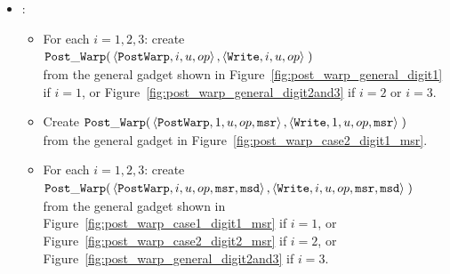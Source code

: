 \begin{itemize}
        \item {\postwarp}:
        \begin{itemize}
           \item For each $i = 1,2,3$: create\\
            $\begin{aligned}[t]
                \postwarp(& \left \langle {\tt PostWarp}, i, u, \inc \right\rangle,    %
                            \left \langle {\tt Write},    i, u, \inc \right\rangle \;) %
            \end{aligned}$ \\
            from the general gadget shown in Figure~\ref{fig:post_warp_general_digit1} if $i = 1$,
            or Figure~\ref{fig:post_warp_general_digit2and3} if $ i = 2$ or $i = 3$.
            \vspace{.5cm}


            \item Create
            $\begin{aligned}[t]
                \postwarp(& \left \langle {\tt PostWarp}, 1, u, \inc, {\tt msr} \right\rangle,    %
                            \left \langle {\tt Write},    1, u, \inc, {\tt msr} \right\rangle \;) %
            \end{aligned}$ \\
            from the general gadget in Figure~\ref{fig:post_warp_case2_digit1_msr}.
            \vspace{.5cm}

            \item For each $i=1,2,3$: create\\
            $\begin{aligned}[t]
                \postwarp(& \left \langle {\tt PostWarp}, i, u, \inc, {\tt msr}, {\tt msd} \right\rangle,    %
                            \left \langle {\tt Write},    i, u, \inc, {\tt msr}, {\tt msd} \right\rangle \;) %
            \end{aligned}$ \\
            from the general gadget shown in Figure~\ref{fig:post_warp_case1_digit1_msr} if $i = 1$, or
            Figure~\ref{fig:post_warp_case2_digit2_msr} if $i = 2$, or Figure~\ref{fig:post_warp_general_digit2and3} if $i = 3$.
            \vspace{.5cm}

        \end{itemize}



\end{itemize}
